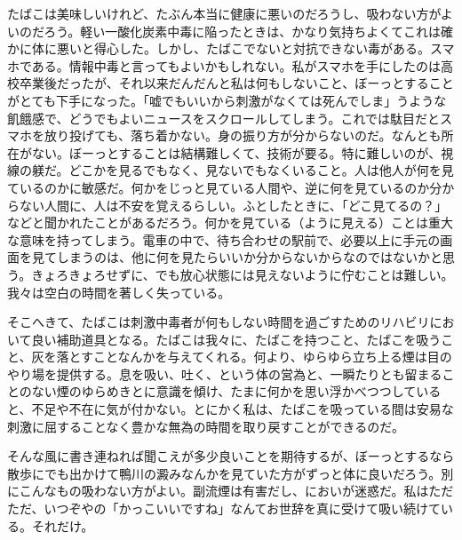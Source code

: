たばこは美味しいけれど、たぶん本当に健康に悪いのだろうし、吸わない方がよいのだろう。軽い一酸化炭素中毒に陥ったときは、かなり気持ちよくてこれは確かに体に悪いと得心した。しかし、たばこでないと対抗できない毒がある。スマホである。情報中毒と言ってもよいかもしれない。私がスマホを手にしたのは高校卒業後だったが、それ以来だんだんと私は何もしないこと、ぼーっとすることがとても下手になった。「嘘でもいいから刺激がなくては死んでしま」うような飢餓感で、どうでもよいニュースをスクロールしてしまう。これでは駄目だとスマホを放り投げても、落ち着かない。身の振り方が分からないのだ。なんとも所在がない。ぼーっとすることは結構難しくて、技術が要る。特に難しいのが、視線の躾だ。どこかを見るでもなく、見ないでもなくいること。人は他人が何を見ているのかに敏感だ。何かをじっと見ている人間や、逆に何を見ているのか分からない人間に、人は不安を覚えるらしい。ふとしたときに、「どこ見てるの？」などと聞かれたことがあるだろう。何かを見ている（ように見える）ことは重大な意味を持ってしまう。電車の中で、待ち合わせの駅前で、必要以上に手元の画面を見てしまうのは、他に何を見たらいいか分からないからなのではないかと思う。きょろきょろせずに、でも放心状態には見えないように佇むことは難しい。我々は空白の時間を著しく失っている。

そこへきて、たばこは刺激中毒者が何もしない時間を過ごすためのリハビリにおいて良い補助道具となる。たばこは我々に、たばこを持つこと、たばこを吸うこと、灰を落とすことなんかを与えてくれる。何より、ゆらゆら立ち上る煙は目のやり場を提供する。息を吸い、吐く、という体の営為と、一瞬たりとも留まることのない煙のゆらめきとに意識を傾け、たまに何かを思い浮かべつつしていると、不足や不在に気が付かない。とにかく私は、たばこを吸っている間は安易な刺激に屈することなく豊かな無為の時間を取り戻すことができるのだ。

そんな風に書き連ねれば聞こえが多少良いことを期待するが、ぼーっとするなら散歩にでも出かけて鴨川の澱みなんかを見ていた方がずっと体に良いだろう。別にこんなもの吸わない方がよい。副流煙は有害だし、においが迷惑だ。私はただただ、いつぞやの「かっこいいですね」なんてお世辞を真に受けて吸い続けている。それだけ。
